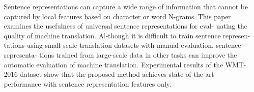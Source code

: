 Sentence representations can capture a wide range of information that cannot be captured by local features based on character or word N-grams. This paper examines the usefulness of universal sentence representations for eval- uating the quality of machine translation. Al-though it is difficult to train sentence represen- tations using small-scale translation datasets with manual evaluation, sentence representa- tions trained from large-scale data in other tasks can improve the automatic evaluation of machine translation. Experimental results of the WMT-2016 dataset show that the proposed method achieves state-of-the-art performance with sentence representation features only.
